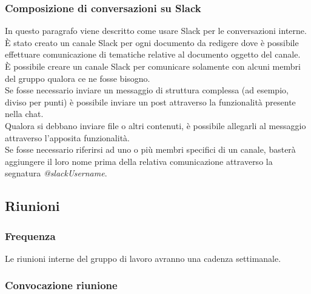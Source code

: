 \documentclass[../NormeDiProgetto.tex]{subfiles}
\begin{document}
			\subsubsection{Composizione di conversazioni su Slack}
				In questo paragrafo viene descritto come usare Slack per le conversazioni interne.\\
				È stato creato un canale Slack per ogni documento da redigere dove è possibile
				effettuare comunicazione di tematiche relative al documento oggetto del canale.\\
				È possibile creare un canale Slack per comunicare solamente con alcuni membri del
				gruppo qualora ce ne fosse bisogno.\\
				Se fosse necessario inviare un messaggio di struttura complessa (ad esempio, diviso
				per punti) è possibile inviare un post attraverso la funzionalità presente nella chat.\\
				Qualora si debbano inviare file o altri contenuti, è possibile allegarli al messaggio
				attraverso l'apposita funzionalità.\\
				Se fosse necessario riferirsi ad uno o più membri specifici di un canale, basterà
				aggiungere il loro nome prima della relativa comunicazione attraverso la segnatura
				\textit{@slackUsername}.
			\subsection{Riunioni}
				\subsubsection{Frequenza}
					Le riunioni interne del gruppo di lavoro avranno una cadenza settimanale.
				\subsubsection{Convocazione riunione}
\end{document}
